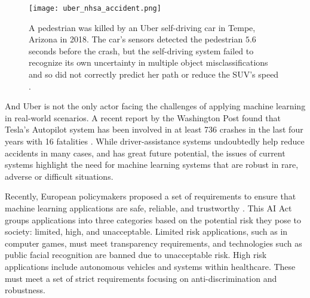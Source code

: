 \begin{figure}[t]
    \centering
    \texttt{[image: uber\_nhsa\_accident.png]}
    \caption[A pedestrian was killed by an Uber self-driving car in Tempe, Arizona in 2018.]{A pedestrian was killed by an Uber self-driving car in Tempe, Arizona in 2018. The car's sensors detected the pedestrian $5.6$ seconds before the crash, but the self-driving system failed to recognize its own uncertainty in multiple object misclassifications and so did not correctly predict her path or reduce the SUV's speed \parencite[photo credit][]{nationaltransportationsafetyboardnhsa_collision_2019}.}
    \label{fig:uber_nhsa_accident}
\end{figure}

And Uber is not the only actor facing the challenges of applying machine learning in real-world scenarios. A recent report by the Washington Post found that Tesla's Autopilot system has been involved in at least 736 crashes in the last four years with 16 fatalities \parencite{siddiqui_17_2023}. 
While driver-assistance systems undoubtedly help reduce accidents in many cases, and has great future potential, the issues of current systems highlight the need for machine learning systems that are robust in rare, adverse or difficult situations. 

Recently, European policymakers proposed a set of requirements to ensure that machine learning applications are safe, reliable, and trustworthy \parencite{europeancommission_briefing_2021}. 
This AI Act groups applications into three categories based on the potential risk they pose to society: limited, high, and unacceptable. Limited risk applications, such as in computer games, must meet transparency requirements, and technologies such as public facial recognition are banned due to unacceptable risk. 
High risk applications include autonomous vehicles and systems within healthcare. These must meet a set of strict requirements focusing on anti-discrimination and robustness.


